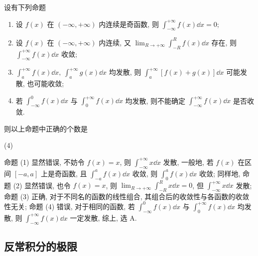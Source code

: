 \begin{example}
    设有下列命题
    \begin{enumerate}[label=(\arabic{*})]
        \item 设 $ f(x) $ 在 $ (-\infty,+\infty) $ 内连续是奇函数, 则 $\displaystyle  \int_{-\infty}^{+\infty} f(x) \dd x=0 $;
        \item 设 $ f(x) $ 在 $ (-\infty,+\infty) $ 内连续, 又 $\displaystyle \lim _{R \to+\infty} \int_{-R}^{R} f(x) \dd x $ 存在, 则 $\displaystyle \int_{-\infty}^{+\infty} f(x) \dd x $ 收敛;
        \item $\displaystyle \int_{a}^{+\infty} f(x) \dd x,~ \int_{a}^{+\infty} g(x) \dd x $ 均发散, 则 $\displaystyle  \int_{a}^{+\infty}[f(x)+g(x)] \dd x $ 可能发散, 也可能收敛;
        \item 若 $ \displaystyle \int_{-\infty}^{0} f(x) \dd x $ 与 $\displaystyle  \int_{0}^{+\infty} f(x) \dd x $ 均发散, 则不能确定 $\displaystyle \int_{-\infty}^{+\infty} f(x) \dd x $ 是否收敛.
    \end{enumerate}
    则以上命题中正确的个数是
    \begin{tasks}(4)
    \end{tasks}
\end{example}
\begin{solution}
    命题 (1) 显然错误, 不妨令 $f(x)=x$, 则 $\displaystyle\int_{-\infty}^{+\infty}x\dd x$ 发散, 一般地, 若 $f(x)$ 在区间 $[-a,a]$ 上是奇函数, 且 $\displaystyle\int_{-a}^{a}f(x)\dd x$ 收敛, 则 $\displaystyle\int_{0}^{a}f(x)\dd x$ 收敛;
    同样地, 命题 (2) 显然错误, 也令 $f(x)=x$, 则 $\displaystyle\lim_{R\to+\infty}\int_{-R}^{R}x\dd x=0$, 但 $\displaystyle\int_{-\infty}^{+\infty}x\dd x$ 发散;
    命题 (3) 正确, 对于不同名的函数的线性组合, 其组合后的收敛性与各函数的收敛性无关; 命题 (4) 错误, 对于相同的函数, 若 $ \displaystyle \int_{-\infty}^{0} f(x) \dd x $ 与 $\displaystyle  \int_{0}^{+\infty} f(x) \dd x $ 均发散,
    则 $\displaystyle \int_{-\infty}^{+\infty} f(x) \dd x $ 一定发散, 综上, 选 A.
\end{solution}

\subsection{反常积分的极限}

